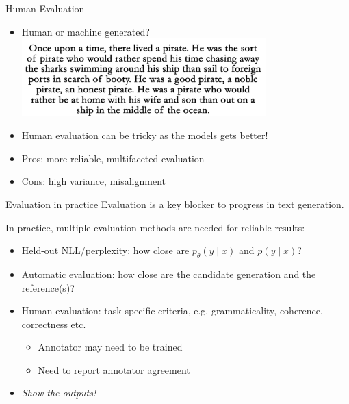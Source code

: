 \documentclass[usenames,dvipsnames,11pt,aspectratio=169]{beamer}
\begin{document}
\begin{frame}
    {Human Evaluation}
    \begin{itemize}
        \item Human or machine generated?\\
            \includegraphics[height=3cm]{figures/gpt3-gen}
            \pause
        \item Human evaluation can be tricky as the models gets better!
        \item Pros: more reliable, multifaceted evaluation
        \item Cons: high variance, misalignment
    \end{itemize}
\end{frame}

\begin{frame}
    {Evaluation in practice}
    Evaluation is a key blocker to progress in text generation.

    In practice, multiple evaluation methods are needed for reliable results:\\
    \begin{itemize}
        \item Held-out NLL/perplexity: how close are $p_\theta(y\mid x)$ and $p(y\mid x)$?
        \item Automatic evaluation: how close are the candidate generation and the reference(s)?
        \item Human evaluation: task-specific criteria, e.g. grammaticality, coherence, correctness etc.
            \begin{itemize}
                \item Annotator may need to be trained
                \item Need to report annotator agreement
            \end{itemize}
        \item \emph{Show the outputs!}
    \end{itemize}
\end{frame}

\end{document}
